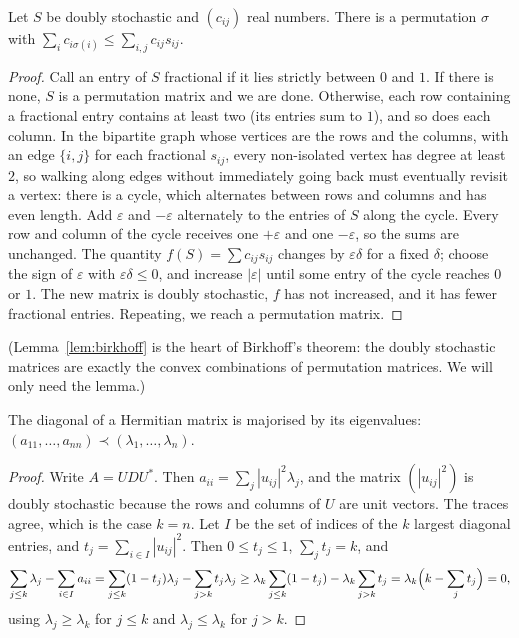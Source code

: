 \begin{lemma}\label{lem:birkhoff}
Let $S$ be doubly stochastic and $(c_{ij})$ real numbers. There is a permutation $\sigma$ with $\sum_ic_{i\sigma(i)}\le
\sum_{i,j}c_{ij}s_{ij}$.
\end{lemma}
\begin{proof}
Call an entry of $S$ fractional if it lies strictly between $0$ and $1$. If there is none, $S$ is a permutation matrix and
we are done. Otherwise, each row containing a fractional entry contains at least two (its entries sum to $1$), and so does
each column. In the bipartite graph whose vertices are the rows and the columns, with an edge $\{i,j\}$ for each fractional
$s_{ij}$, every non-isolated vertex has degree at least $2$, so walking along edges without immediately going back must
eventually revisit a vertex: there is a cycle, which alternates between rows and columns and has even length. Add $\varepsilon$
and $-\varepsilon$ alternately to the entries of $S$ along the cycle. Every row and column of the cycle receives one $+\varepsilon$
and one $-\varepsilon$, so the sums are unchanged. The quantity $f(S)=\sum c_{ij}s_{ij}$ changes by $\varepsilon\delta$ for a
fixed $\delta$; choose the sign of $\varepsilon$ with $\varepsilon\delta\le0$, and increase $|\varepsilon|$ until some entry of
the cycle reaches $0$ or $1$. The new matrix is doubly stochastic, $f$ has not increased, and it has fewer fractional entries.
Repeating, we reach a permutation matrix.
\end{proof}

(Lemma~\ref{lem:birkhoff} is the heart of Birkhoff's theorem: the doubly stochastic matrices are exactly the convex
combinations of permutation matrices. We will only need the lemma.)

\begin{theorem}[Schur, 1923]\label{thm:schurmaj}
The diagonal of a Hermitian matrix is majorised by its eigenvalues: $(a_{11},\dots,a_{nn})\prec(\lambda_1,\dots,\lambda_n)$.
\end{theorem}
\begin{proof}
Write $A=UDU^*$. Then $a_{ii}=\sum_j|u_{ij}|^2\lambda_j$, and the matrix $(|u_{ij}|^2)$ is doubly stochastic because the rows
and columns of $U$ are unit vectors. The traces agree, which is the case $k=n$. Let $I$ be the set of indices of the $k$
largest diagonal entries, and $t_j=\sum_{i\in I}|u_{ij}|^2$. Then $0\le t_j\le1$, $\sum_jt_j=k$, and
\[
\sum_{j\le k}\lambda_j-\sum_{i\in I}a_{ii}=\sum_{j\le k}(1-t_j)\lambda_j-\sum_{j>k}t_j\lambda_j
\ge\lambda_k\sum_{j\le k}(1-t_j)-\lambda_k\sum_{j>k}t_j=\lambda_k\Bigl(k-\sum_jt_j\Bigr)=0,
\]
using $\lambda_j\ge\lambda_k$ for $j\le k$ and $\lambda_j\le\lambda_k$ for $j>k$.
\end{proof}

